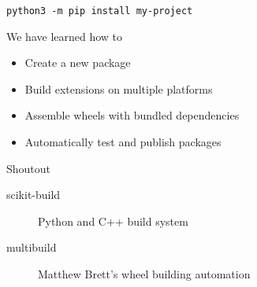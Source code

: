 \documentclass[pdf]{beamer}
\begin{document}
\begin{frame}[fragile]{}
    \verb|python3 -m pip install my-project|
\end{frame}

\begin{frame}{We have learned how to}
    \begin{itemize}
        \item Create a new package
        \item Build extensions on multiple platforms
        \item Assemble wheels with bundled dependencies
        \item Automatically test and publish packages
    \end{itemize}
\end{frame}

\begin{frame}{Shoutout}
    \begin{description}
        \item [scikit-build] Python and C++ build system
        \item [multibuild] Matthew Brett's wheel building automation
    \end{description}
\end{frame}
\end{document}
